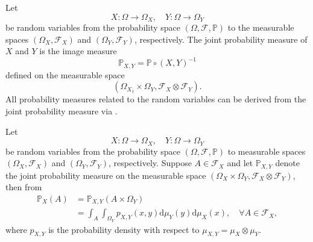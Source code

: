 \begin{definition}
	\label{def:joint}
	Let
	\begin{equation}
		X\colon \Omega \to \Omega_X, \quad Y\colon \Omega \to \Omega_Y
	\end{equation}
	be random variables from the probability space $(\Omega, \mathcal{F}, \mathbb{P})$ to the measurable spaces $(\Omega_X, \mathcal{F}_X)$ and $(\Omega_Y, \mathcal{F}_Y)$, respectively.	The joint probability measure of $X$ and $Y$ is the image measure
	\begin{equation}
		\mathbb{P}_{X,Y} = \mathbb{P}\circ(X,Y)^{-1}
	\end{equation}
	defined on the measurable space 
	\begin{equation}
		(\Omega_{X_1}\times\Omega_{Y}, \mathcal{F}_{X}\otimes\mathcal{F}_{Y}).
	\end{equation}	
	All probability measures related to the random variables can be derived from the joint probability measure via .
\end{definition}

\newpage
\begin{remark}
	\label{remark:marginalization}
	Let
	\begin{equation}
		X\colon \Omega \to \Omega_X, \quad Y\colon \Omega \to \Omega_Y
	\end{equation}
	be random variables from the probability space $(\Omega, \mathcal{F}, \mathbb{P})$ to measurable spaces $(\Omega_X, \mathcal{F}_X)$ and $(\Omega_Y, \mathcal{F}_Y)$, respectively. Suppose $A\in \mathcal{F}_X$ and let $\mathbb{P}_{X,Y}$ denote the joint probability measure on the measurable space $(\Omega_{X}\times\Omega_{Y}, \mathcal{F}_{X}\otimes\mathcal{F}_{Y})$, then from 
	\begin{equation}
			\begin{split}
				\mathbb{P}_X(A) &= \mathbb{P}_{X,Y}(A \times \Omega_Y)\\
				& = \int_{A}\int_{\Omega_Y}p_{X,Y}(x,y)\mathrm{d}\mu_Y(y)\mathrm{d}\mu_X(x), \quad \forall A \in \mathcal{F}_X,
			\end{split}
	\end{equation}
	where $p_{X,Y}$ is the probability density with respect to $\mu_{X,Y} = \mu_X \otimes \mu_Y$.
\end{remark}

